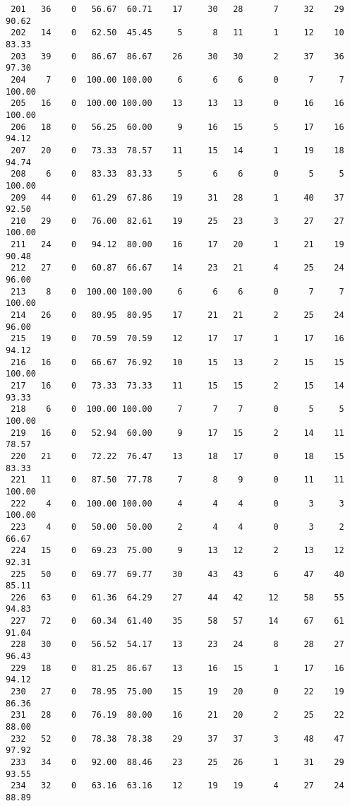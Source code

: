 \begin{verbatim}
 201   36    0   56.67  60.71    17     30   28      7     32    29    90.62
 202   14    0   62.50  45.45     5      8   11      1     12    10    83.33
 203   39    0   86.67  86.67    26     30   30      2     37    36    97.30
 204    7    0  100.00 100.00     6      6    6      0      7     7   100.00
 205   16    0  100.00 100.00    13     13   13      0     16    16   100.00
 206   18    0   56.25  60.00     9     16   15      5     17    16    94.12
 207   20    0   73.33  78.57    11     15   14      1     19    18    94.74
 208    6    0   83.33  83.33     5      6    6      0      5     5   100.00
 209   44    0   61.29  67.86    19     31   28      1     40    37    92.50
 210   29    0   76.00  82.61    19     25   23      3     27    27   100.00
 211   24    0   94.12  80.00    16     17   20      1     21    19    90.48
 212   27    0   60.87  66.67    14     23   21      4     25    24    96.00
 213    8    0  100.00 100.00     6      6    6      0      7     7   100.00
 214   26    0   80.95  80.95    17     21   21      2     25    24    96.00
 215   19    0   70.59  70.59    12     17   17      1     17    16    94.12
 216   16    0   66.67  76.92    10     15   13      2     15    15   100.00
 217   16    0   73.33  73.33    11     15   15      2     15    14    93.33
 218    6    0  100.00 100.00     7      7    7      0      5     5   100.00
 219   16    0   52.94  60.00     9     17   15      2     14    11    78.57
 220   21    0   72.22  76.47    13     18   17      0     18    15    83.33
 221   11    0   87.50  77.78     7      8    9      0     11    11   100.00
 222    4    0  100.00 100.00     4      4    4      0      3     3   100.00
 223    4    0   50.00  50.00     2      4    4      0      3     2    66.67
 224   15    0   69.23  75.00     9     13   12      2     13    12    92.31
 225   50    0   69.77  69.77    30     43   43      6     47    40    85.11
 226   63    0   61.36  64.29    27     44   42     12     58    55    94.83
 227   72    0   60.34  61.40    35     58   57     14     67    61    91.04
 228   30    0   56.52  54.17    13     23   24      8     28    27    96.43
 229   18    0   81.25  86.67    13     16   15      1     17    16    94.12
 230   27    0   78.95  75.00    15     19   20      0     22    19    86.36
 231   28    0   76.19  80.00    16     21   20      2     25    22    88.00
 232   52    0   78.38  78.38    29     37   37      3     48    47    97.92
 233   34    0   92.00  88.46    23     25   26      1     31    29    93.55
 234   32    0   63.16  63.16    12     19   19      4     27    24    88.89

\end{verbatim}
